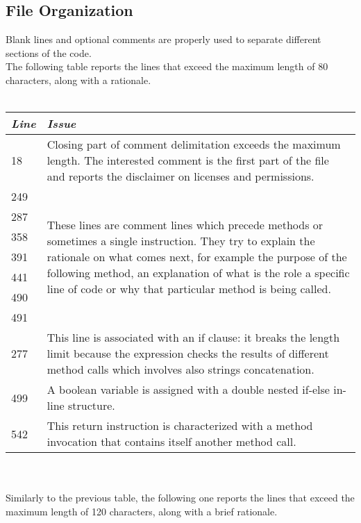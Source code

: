 \documentclass[11pt,a4paper]{report}
\begin{document}
\subsection{File Organization}
Blank lines and optional comments are properly used to separate different sections of the code.\\
The following table reports the lines that exceed the maximum length of 80 characters, along with a rationale.\\
\\
\begin{tabularx}{\textwidth}{|l|X|}
	\hline
	\textit{Line} & \textit{Issue}\\
	\hline
	\hline
	18 & Closing part of comment delimitation exceeds the maximum length. The interested comment is the first part of the file and reports the disclaimer on licenses and permissions.	 \\
	\hline
	249 & \multirow{7}{\linewidth}{These lines are comment lines which precede methods or sometimes a single instruction. They try to explain the rationale on what comes next, for example the purpose of the following method, an explanation of what is the role a specific line of code or why that particular method is being called.}\\
	287 & \\
	358& \\
	391& \\
	441& \\
	490& \\
	491& \\
	\hline
	277 & This line is associated with an if clause: it breaks the length limit because the expression checks the results of different method calls which involves also strings concatenation.\\
	\hline
	499 & A boolean variable is assigned with a double nested if-else in-line structure.\\
	\hline
	542 & This return instruction is characterized with a method invocation that contains itself another method call. \\
	\hline
\end{tabularx}\\
\\
Similarly to the previous table, the following one reports the lines that exceed the maximum length of 120 characters, along with a brief rationale.\\
\\
\end{document}
